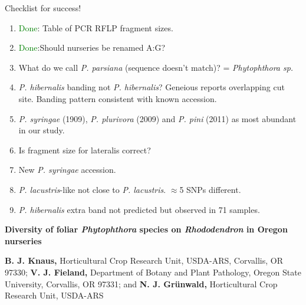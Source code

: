 \documentclass[12pt]{article}
\date{}
\begin{document}

Checklist for success!

\begin{enumerate}
  \item \textcolor{green}{Done}: Table of PCR RFLP fragment sizes.
  \item \textcolor{green}{Done}:Should nurseries be renamed A:G?


  \item What do we call \emph{P. parsiana} (sequence doesn't match)? = \emph{Phytophthora sp.}
  \item \emph{P. hibernalis} banding not \emph{P. hibernalis}? Geneious reports overlapping cut site. Banding pattern consistent with known accession.

  \item \emph{P. syringae} (1909), \emph{P. plurivora} (2009) and \emph{P. pini} (2011) as most abundant in our study.
  \item Is fragment size for lateralis correct?
  \item New \emph{P. syringae} accession.
  \item \emph{P. lacustris}-like not close to \emph{P. lacustris}. $\approx$5 SNPs different.
  \item \emph{P. hibernalis} extra band not predicted but observed in 71 samples.


\end{enumerate}

\newpage


\begin{flushleft}
{\large
\textbf{Diversity of foliar \textit{Phytophthora} species on \textit{Rhododendron} in Oregon nurseries}
}
\\

\hspace{12pt}

\textbf{B. J. Knaus,} Horticultural Crop Research Unit, USDA-ARS, Corvallis, OR 97330; \textbf{V. J. Fieland,} Department of Botany and Plant Pathology, Oregon State University, Corvallis, OR 97331; and \textbf{N. J. Gr\"{u}nwald,} Horticultural Crop Research Unit, USDA-ARS\\

\end{flushleft}
\end{document}
